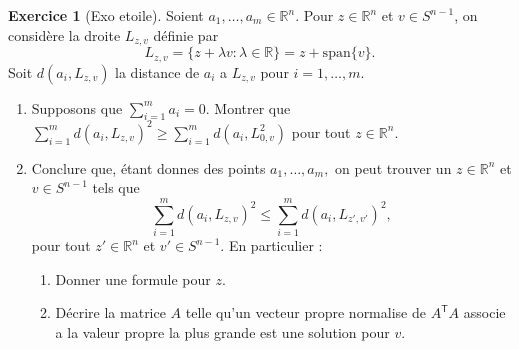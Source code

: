 \documentclass[a4paper,12pt,french]{report}
\theoremstyle{plain}
\theoremstyle{definition}
\newtheorem{exercise}{Exercice}[chapter]
\begin{document}
\begin{exercise}[Exo etoile]
Soient $a_{1},\dots,a_{m}\in \mathbb{R}^{n}$. Pour $z\in \mathbb{R}^{n}$ et $v\in S^{n-1}$, on considère la droite $L_{z,v}$ définie par
$$
L_{z,v}=\{ z+\lambda v:\lambda \in \mathbb{R} \}=z+\mathrm{span}\{ v \}.
$$
Soit $d(a_{i},L_{z,v})$ la distance de $a_{i}$ a $L_{z,v}$ pour $i=1,\dots,m$.
\begin{enumerate}
\item Supposons que $\sum_{i=1}^{m}a_{i}=0$. Montrer que $\sum_{i=1}^{m}d(a_{i},L_{z,v})^{2}\ge \sum_{i=1}^{m}d(a_{i},L_{0,v}^{2})$ pour tout $z\in \mathbb{R}^{n}$.
\item Conclure que, étant donnes des points $a_{1},\dots,a_{m},$ on peut trouver un $z\in \mathbb{R}^{n}$ et $v\in S^{n-1}$ tels que
$$
\sum_{i=1}^{m} d(a_{i},L_{z,v})^{2}\le \sum_{i=1}^{m} d(a_{i},L_{z',v'})^{2},
$$
pour tout $z'\in \mathbb{R}^{n}$ et $v'\in S^{n-1}$. En particulier :
\begin{enumerate}
\item Donner une formule pour $z$.
\item Décrire la matrice $A$ telle qu'un vecteur propre normalise de $A^{\mathsf{T}}A$ associe a la valeur propre la plus grande est une solution pour $v$.
\end{enumerate}
\end{enumerate}
\end{exercise}
\end{document}
